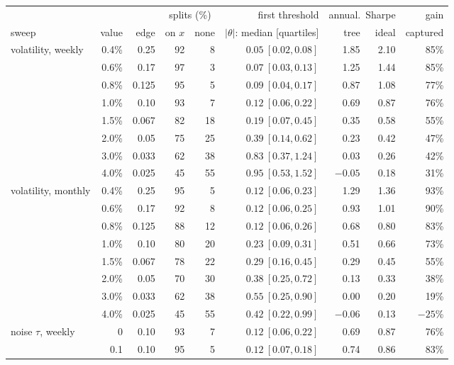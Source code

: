 \documentclass[11pt,a4paper]{article}
\newcommand{\1}{\mathbf{1}}
\begin{document}
\begin{table}[H]
\centering\footnotesize
\setlength{\tabcolsep}{3.5pt}
\begin{tabular}{@{}l r r rr r rr r@{}}
\toprule
& & & \multicolumn{2}{c}{splits (\%)} & first threshold & \multicolumn{2}{c}{annual.\ Sharpe} & gain\\
\cmidrule(lr){4-5}\cmidrule(lr){7-8}
sweep & value & edge & on $x$ & none & $|\theta|$: median [quartiles] & tree & ideal & captured\\
\midrule
volatility, weekly & 0.4\% & 0.25 & 92 & 8 & $0.05\ [0.02, 0.08]$ & 1.85 & 2.10 & 85\%\\
 & 0.6\% & 0.17 & 97 & 3 & $0.07\ [0.03, 0.13]$ & 1.25 & 1.44 & 85\%\\
 & 0.8\% & 0.125 & 95 & 5 & $0.09\ [0.04, 0.17]$ & 0.87 & 1.08 & 77\%\\
 & 1.0\% & 0.10 & 93 & 7 & $0.12\ [0.06, 0.22]$ & 0.69 & 0.87 & 76\%\\
 & 1.5\% & 0.067 & 82 & 18 & $0.19\ [0.07, 0.45]$ & 0.35 & 0.58 & 55\%\\
 & 2.0\% & 0.05 & 75 & 25 & $0.39\ [0.14, 0.62]$ & 0.23 & 0.42 & 47\%\\
 & 3.0\% & 0.033 & 62 & 38 & $0.83\ [0.37, 1.24]$ & 0.03 & 0.26 & 42\%\\
 & 4.0\% & 0.025 & 45 & 55 & $0.95\ [0.53, 1.52]$ & $-0.05$ & 0.18 & 31\%\\
\midrule
volatility, monthly & 0.4\% & 0.25 & 95 & 5 & $0.12\ [0.06, 0.23]$ & 1.29 & 1.36 & 93\%\\
 & 0.6\% & 0.17 & 92 & 8 & $0.12\ [0.06, 0.25]$ & 0.93 & 1.01 & 90\%\\
 & 0.8\% & 0.125 & 88 & 12 & $0.12\ [0.06, 0.26]$ & 0.68 & 0.80 & 83\%\\
 & 1.0\% & 0.10 & 80 & 20 & $0.23\ [0.09, 0.31]$ & 0.51 & 0.66 & 73\%\\
 & 1.5\% & 0.067 & 78 & 22 & $0.29\ [0.16, 0.45]$ & 0.29 & 0.45 & 55\%\\
 & 2.0\% & 0.05 & 70 & 30 & $0.38\ [0.25, 0.72]$ & 0.13 & 0.33 & 38\%\\
 & 3.0\% & 0.033 & 62 & 38 & $0.55\ [0.25, 0.90]$ & 0.00 & 0.20 & 19\%\\
 & 4.0\% & 0.025 & 45 & 55 & $0.42\ [0.22, 0.99]$ & $-0.06$ & 0.13 & $-25$\%\\
\midrule
noise $\tau$, weekly & 0 & 0.10 & 93 & 7 & $0.12\ [0.06, 0.22]$ & 0.69 & 0.87 & 76\%\\
 & 0.1 & 0.10 & 95 & 5 & $0.12\ [0.07, 0.18]$ & 0.74 & 0.86 & 83\%\\

\end{tabular}
\end{table}
\end{document}
